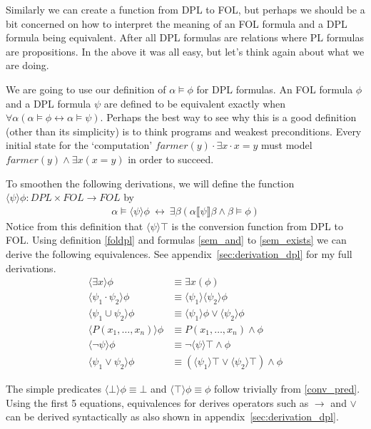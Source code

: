 \documentclass[12pt]{article}
\begin{document}
Similarly we can create a function from DPL to FOL, but perhaps we should be a bit concerned on how to interpret the meaning of an FOL formula and a DPL formula being equivalent. After all DPL formulas are relations where PL formulas are propositions. In the above it was all easy, but let's think again about what we are doing.

We are going to use our definition of $\alpha\models\phi$ for DPL formulas. An FOL formula $\phi$ and a DPL formula $\psi$ are defined to be equivalent exactly when $\forall\alpha(\alpha\models\phi\leftrightarrow\alpha\models\psi)$. Perhaps the best way to see why this is a good definition (other than its simplicity) is to think programs and weakest preconditions. Every initial state for the `computation' $farmer(y)\cdot\exists x\cdot x=y$ must model $farmer(y)\wedge\exists x(x=y)$ in order to succeed.

To smoothen the following derivations, we will define the function $\langle\psi\rangle\phi:DPL\times FOL\to FOL$ by
\begin{align}
\alpha\models\langle\psi\rangle\phi\ \leftrightarrow\ \exists\beta(\alpha\llbracket\psi\rrbracket\beta \wedge \beta\models\phi)\label{foldpl}
\end{align}
Notice from this definition that $\langle\psi\rangle\top$ is the conversion function from DPL to FOL.
Using definition \eqref{foldpl} and formulas \eqref{sem_and} to \eqref{sem_exists} we can derive the following equivalences. See appendix~\ref{sec:derivation_dpl} for my full derivations.
%
\begin{align}
\langle\exists x\rangle\phi & \equiv \exists x (\phi) \label{conv_exists}\\
\langle\psi_1\cdot\psi_2\rangle\phi & \equiv \langle\psi_1\rangle\langle\psi_2\rangle\phi \label{conv_and}\\
\langle\psi_1 \cup \psi_2\rangle\phi & \equiv \langle\psi_1\rangle\phi \vee \langle\psi_2\rangle\phi \label{conv_or}\\
\langle P(x_1,\dots,x_n)\rangle\phi & \equiv  P(x_1,\dots,x_n) \wedge \phi \label{conv_pred}\\
\langle\neg\psi\rangle\phi & \equiv  \neg\langle\psi\rangle\top \wedge \phi \label{conv_neg}\\
\langle\psi_1\vee\psi_2\rangle\phi & \equiv (\langle\psi_1\rangle\top \vee \langle\psi_2\rangle\top) \wedge\phi \label{conv_vee}
\end{align}

The simple predicates $\langle\bot\rangle\phi\equiv\bot$ and $\langle\top\rangle\phi\equiv\phi$ follow trivially from \eqref{conv_pred}. Using the first 5 equations, equivalences for derives operators such as $\rightarrow$ and $\vee$ can be derived syntactically as also shown in appendix~\ref{sec:derivation_dpl}.
\end{document}

